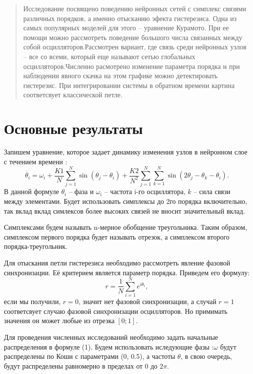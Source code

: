 \begin{abstract}
Исследование посвящено поведению нейронных сетей с симплекс связями различных порядков, а именно отысканию эфекта гистерезиса. Одна из самых популярных моделей для этого -- уравнение Курамото. При ее помощи можно рассмотреть поведение большого числа связанных между собой осцилляторов.Рассмотрен вариант, где связь среди нейронных узлов --   все со всеми, который еще называют сетью глобальных осцилляторов.Численно расмотрено изменение параметра порядка и при наблюдении явного скачка на этом графике можно детектировать гистерезис. При интегрировании системы в обратном времени картина соответсвует классической петле. 
  

\end{abstract}

\section{Основные результаты} %
Запишем уравнение, которое задает динамику изменения узлов в нейронном слое с течением времени :
\begin{equation}\dot{\theta_i}= \omega_i+\frac{K1}{N}\sum^{N}_{j=1} \sin(\theta_j-\theta_i)+\frac{K2}{N^2} \sum^{N}_{j=1} \sum^{N}_{k=1}  \sin (2\theta_j-\theta_k-\theta_i).\end{equation}
В данной формуле $\theta_i$ -- фаза и $\omega_i$ -- частота i-го осциллятора, $k$ -- сила связи между элементами.
Будет использовать симплексы до 2го порядка включительно, так вклад вклад симлексов более высоких связей не вносит значительный вклад.

 Симплексами будем называть n-мерное обобщение треугольника. Таким образом, симплексом первого порядка будет называть отрезок, а симплексом второго порядка-треугольник.

 Для отыскания петли гистерезиса необходимо рассмотреть явление фазовой синхронизации. Её критерием является параметр порядка.
Приведем его формулу: 
\begin{equation} r  =\frac{1}{N} \sum^{N}_{i=1} e^{i \theta_i}, \end{equation} если мы получили, $r=0$, значит   нет фазовой синхронизации, а случай $r=1$ соответсвует случаю фазовой синхронизации осцилляторов. Но примимать значения он может любые из отрезка $[0;1]$.

Для проведения численных исследований необходимо задать начальные распределения в формуле (1). Будем использовать иследующие фазы :$\omega$ будут распределены по Коши с параметрами (0, 0.5), а частоты $\theta$, в свою очередь, будут распределены равномерно в пределах от $0$ до $2\pi$.

